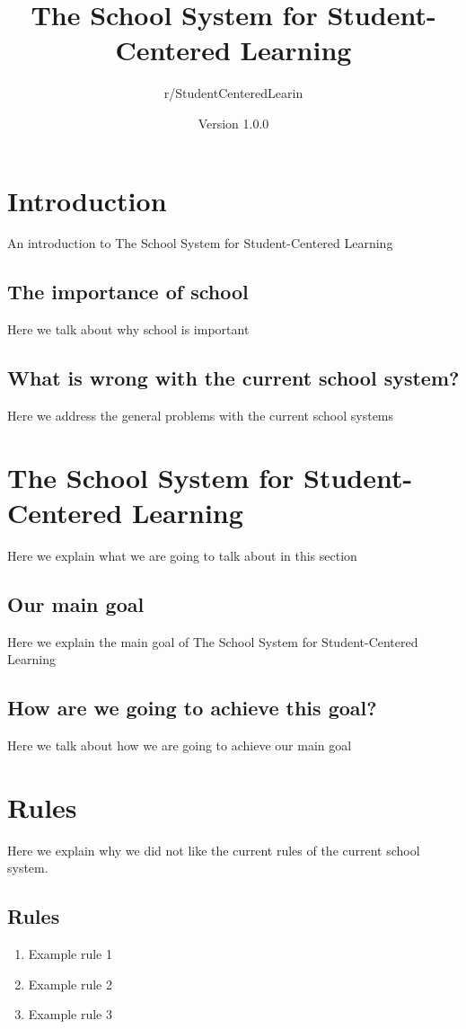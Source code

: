 \documentclass[titlepage]{article}
\author{r/StudentCenteredLearin}
\title{The School System for Student-Centered Learning}
\date{Version 1.0.0}
\begin{document}
\maketitle
\newpage
\tableofcontents
\newpage
\section{Introduction}
An introduction to The School System for Student-Centered Learning
\subsection{The importance of school}
Here we talk about why school is important
\subsection{What is wrong with the current school system?}
Here we address the general problems with the current school systems


\newpage
\section{The School System for Student-Centered Learning}
Here we explain what we are going to talk about in this section
\subsection{Our main goal}
Here we explain the main goal of The School System for Student-Centered Learning
\subsection{How are we going to achieve this goal?}
Here we talk about how we are going to achieve our main goal

\newpage
\section{Rules}
Here we explain why we did not like the current rules of the current school system.
\subsection{Rules}
\begin{enumerate}
	\item Example rule 1
	\item Example rule 2
	\item Example rule 3
\end{enumerate}
\end{document}
